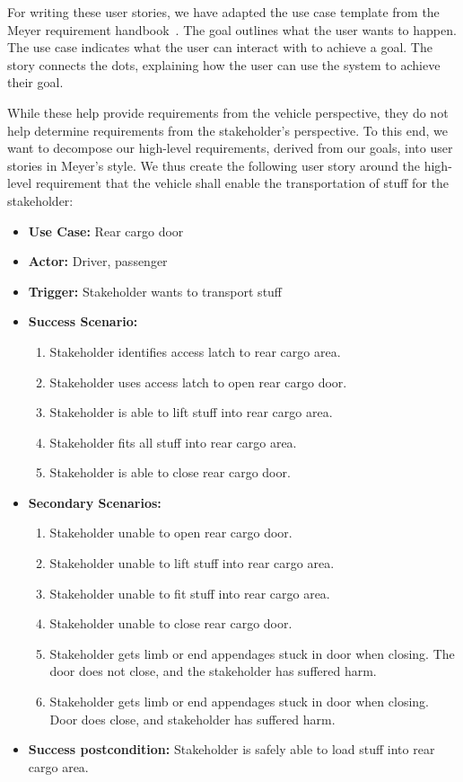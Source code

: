 For writing these user stories, we have adapted the use case template from the Meyer requirement handbook~\cite{meyer2022handbook}. The goal outlines what the user wants to happen. The use case indicates what the user can interact with to achieve a goal. The story connects the dots, explaining how the user can use the system to achieve their goal.

While these help provide requirements from the vehicle perspective, they do not help determine requirements from the stakeholder's perspective. To this end, we want to decompose our high-level requirements, derived from our goals, into user stories in Meyer's style. We thus create the following user story around the high-level requirement that the vehicle shall enable the transportation of stuff for the stakeholder:
\begin{itemize}
	\item \textbf{Use Case:} Rear cargo door
	\item \textbf{Actor:} Driver, passenger
	\item \textbf{Trigger:} Stakeholder wants to transport stuff
	\item \textbf{Success Scenario:}
	\begin{enumerate}
		\item Stakeholder identifies access latch to rear cargo area.
		\item Stakeholder uses access latch to open rear cargo door.
		\item Stakeholder is able to lift stuff into rear cargo area.
		\item Stakeholder fits all stuff into rear cargo area.
		\item Stakeholder is able to close rear cargo door.
	\end{enumerate}
	\item \textbf{Secondary Scenarios:}
	\begin{enumerate}
		\item Stakeholder unable to open rear cargo door.
		\item Stakeholder unable to lift stuff into rear cargo area.
		\item Stakeholder unable to fit stuff into rear cargo area.
		\item Stakeholder unable to close rear cargo door.
		\item Stakeholder gets limb or end appendages stuck in door when closing. The door does not close, and the stakeholder has suffered harm.
		\item Stakeholder gets limb or end appendages stuck in door when closing. Door does close, and stakeholder has suffered harm.
	\end{enumerate}
	\item \textbf{Success postcondition:} Stakeholder is safely able to load stuff into rear cargo area.
\end{itemize}

